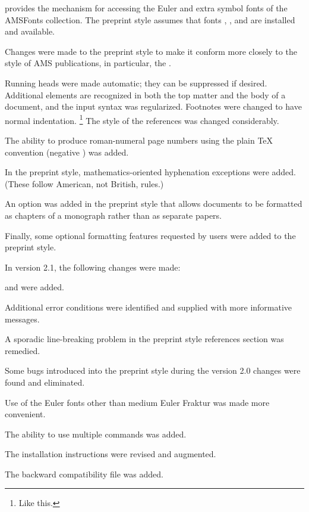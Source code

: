     provides the mechanism for accessing
    the Euler and extra symbol fonts of the AMSFonts collection.
   The preprint style assumes that fonts ,
    , and  are installed and available.

\item Changes were made to the preprint style to make it conform
  more closely to the style of AMS publications, in particular, the \JAMS.

   Running heads were made automatic; they can be suppressed
    if desired.
   Additional elements are recognized in both the top matter
    and the body of a document, and the input syntax was regularized.
   Footnotes were changed to have normal indentation.%
       \footnote{Like this.}
   The style of the references was changed considerably.

\item The ability to produce roman-numeral page numbers using the
  plain \TeX{} convention (negative ) was added.
\item In the preprint style, mathematics-oriented hyphenation exceptions
  were added.  (These follow American, not British, rules.)
\item An option was added in the preprint style that
  allows documents to be formatted
  as chapters of a monograph rather than as separate papers.
\item Finally, some optional formatting features requested by
  \AmSTeX{} users were added to the preprint style.
\endroster

\medskip
In version 2.1, the following changes were made:
\roster
\item {} and  were added.
\item Additional error conditions were identified and supplied with more
  informative messages.
\item A sporadic line-breaking problem in the preprint style references
  section was remedied.
\item Some bugs introduced into the preprint style during the
 version 2.0 changes were found and eliminated.
\item Use of the Euler fonts other than medium Euler Fraktur was
  made more convenient.
\item The ability to use multiple  commands was added.
\item The installation instructions were revised and augmented.
\item The backward compatibility file  was added.
\endroster

